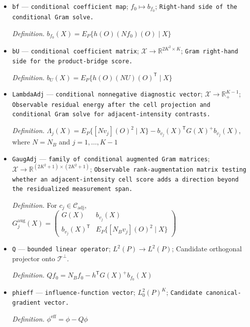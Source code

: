 \documentclass{article}
\begin{document}
\begin{itemize}
  \par\smallskip\noindent\emph{Definition.} \(G(X)=E_P(hh^{\mathsf T}\mid X)\)
  \item \texttt{bf} --- \texttt{conditional coefficient map}; \(f_0\mapsto b_{f_0}\); \texttt{Right-\allowbreak{}hand side of the conditional Gram solve.}
  \par\smallskip\noindent\emph{Definition.} \(b_{f_0}(X)=E_P\{h(O)(Nf_0)(O)\mid X\}\)
  \item \texttt{bU} --- \texttt{conditional coefficient matrix}; \(\mathcal X\to\mathbb R^{2K^{2}\times K}\); \texttt{Gram right-\allowbreak{}hand side for the product-\allowbreak{}bridge score.}
  \par\smallskip\noindent\emph{Definition.} \(b_U(X)=E_P\{h(O)(NU)(O)^{\mathsf T}\mid X\}\)
  \item \texttt{LambdaAdj} --- \texttt{conditional nonnegative diagnostic vector}; \(\mathcal X\to\mathbb R_{+}^{K-1}\); \texttt{Observable residual energy after the cell projection and conditional Gram solve for adjacent-\allowbreak{}intensity contrasts.}
  \par\smallskip\noindent\emph{Definition.} \(\Lambda_j(X)=E_P\{[Nv_j](O)^2\mid X\}-b_{v_j}(X)^{\mathsf T}G(X)^{+}b_{v_j}(X)\), where \(N=N_B\) and \(j=1,\ldots,K-1\)
  \item \texttt{GaugAdj} --- \texttt{family of conditional augmented Gram matrices}; \(\mathcal X\to\mathbb R^{(2K^{2}+1)\times(2K^{2}+1)}\); \texttt{Observable rank-\allowbreak{}augmentation matrix testing whether an adjacent-\allowbreak{}intensity cell score adds a direction beyond the residualized measurement span.}
  \par\smallskip\noindent\emph{Definition.} For \(c_j\in\mathcal C_{\mathrm{adj}}\), \(G_j^{\mathrm{aug}}(X)=\begin{pmatrix}G(X)&b_{v_j}(X)\\b_{v_j}(X)^{\mathsf T}&E_P\{[N_Bv_j](O)^2\mid X\}\end{pmatrix}\)
  \item \texttt{Q} --- \texttt{bounded linear operator}; \(L^{2}(P)\to L^{2}(P)\); Candidate orthogonal projector onto \(\mathcal T^{\perp}\).
  \par\smallskip\noindent\emph{Definition.} \(Qf_0=N_Bf_0-h^{\mathsf T}G(X)^{+}b_{f_0}(X)\)
  \item \texttt{phieff} --- \texttt{influence-\allowbreak{}function vector}; \(L^{2}_{0}(P)^{K}\); \texttt{Candidate canonical-\allowbreak{}gradient vector.}
  \par\smallskip\noindent\emph{Definition.} \(\phi^{\mathrm{eff}}=\phi-Q\phi\)

\end{itemize}
\end{document}
